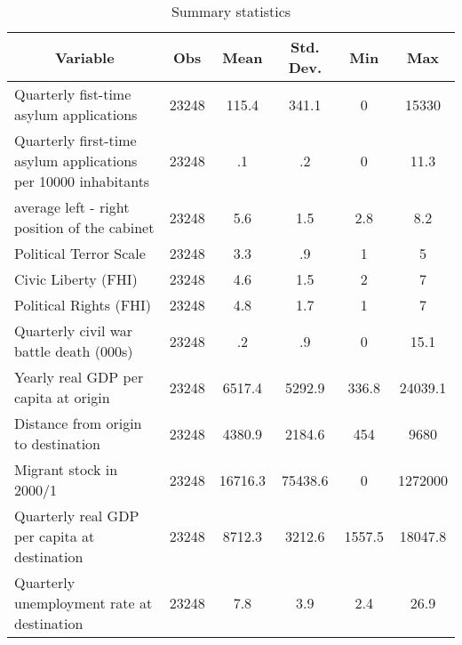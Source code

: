 \begin{table}[htbp]\centering \caption{Summary statistics\label{sumstat}}
\begin{tabular}{l c c c c c }\hline\hline
\multicolumn{1}{c}{Variable} & Obs & Mean & Std. Dev.
 & Min & Max  \\ \hline
Quarterly fist-time asylum applications & 23248 & 115.4 & 341.1 & 0 & 15330  \\
Quarterly first-time asylum applications per 10000 inhabitants & 23248 & .1 & .2 & 0 & 11.3  \\
average left - right position of the cabinet & 23248 & 5.6 & 1.5 & 2.8 & 8.2  \\
Political Terror Scale & 23248 & 3.3 & .9 & 1 & 5  \\
Civic Liberty (FHI) & 23248 & 4.6 & 1.5 & 2 & 7  \\
Political Rights (FHI) & 23248 & 4.8 & 1.7 & 1 & 7  \\
Quarterly civil war battle death (000s) & 23248 & .2 & .9 & 0 & 15.1  \\
Yearly real GDP per capita at origin & 23248 & 6517.4 & 5292.9 & 336.8 & 24039.1  \\
Distance from origin to destination & 23248 & 4380.9 & 2184.6 & 454 & 9680  \\
Migrant stock in 2000/1 & 23248 & 16716.3 & 75438.6 & 0 & 1272000  \\
Quarterly real GDP per capita at destination & 23248 & 8712.3 & 3212.6 & 1557.5 & 18047.8  \\
Quarterly unemployment rate at destination & 23248 & 7.8 & 3.9 & 2.4 & 26.9  \\
\hline\end{tabular}
\end{table}
